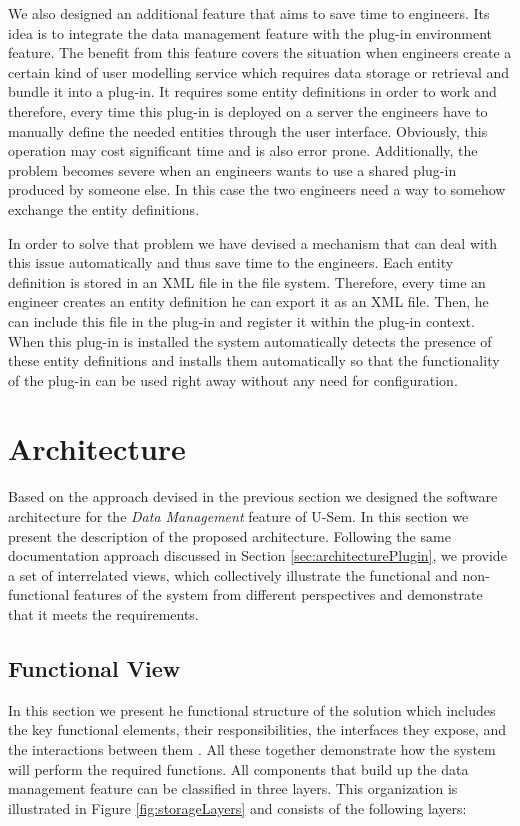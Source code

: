 We also designed an additional feature that aims to save time to engineers. Its idea is to integrate the data management feature with the plug-in environment feature. The benefit from this feature covers the situation when engineers create a certain kind of user modelling service which requires data storage or retrieval and bundle it into a plug-in. It requires some entity definitions in order to work and therefore, every time this plug-in is deployed on a server the engineers have to manually define the needed entities through the user interface. Obviously, this operation may cost significant time and is also error prone. Additionally, the problem becomes severe when an engineers wants to use a shared plug-in produced by someone else. In this case the two engineers need a way to somehow exchange the entity definitions.

In order to solve that problem we have devised a mechanism that can deal with this issue automatically and thus save time to the engineers. Each entity definition is stored in an XML file in the file system. Therefore, every time an engineer creates an entity definition he can export it as an XML file. Then, he can include this file in the plug-in and register it within the plug-in context. When this plug-in is installed the system automatically detects the presence of these entity definitions and installs them automatically so that the functionality of the plug-in can be used right away without any need for configuration.

\section{Architecture}
\label{sec:architectureStorage}

Based on the approach devised in the previous section we designed the software architecture for the \textit{Data Management} feature of U-Sem. In this section we present the description of the proposed architecture. Following the same documentation approach discussed in Section \ref{sec:architecturePlugin}, we provide a set of interrelated views, which collectively illustrate the functional and non-functional features of the system from different perspectives and demonstrate that it meets the requirements. 


\subsection{Functional View}

In this section we present he functional structure of the solution which includes the key functional elements, their responsibilities, the interfaces they expose, and the interactions between them \cite{rozanski2011software}. All these together demonstrate how the system will perform the required functions. All components that build up the data management feature can be classified in three layers. This organization is illustrated in Figure \ref{fig:storageLayers} and consists of the following layers:

